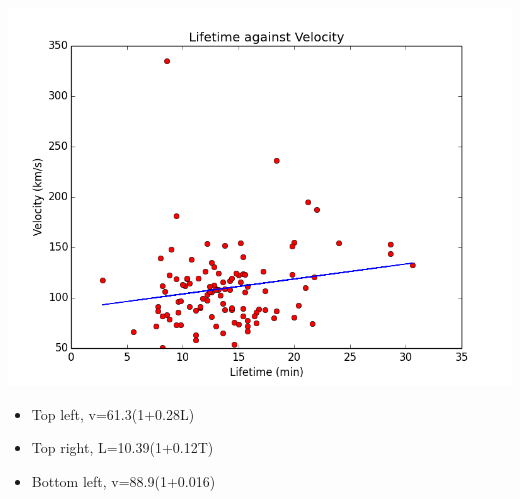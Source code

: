 \documentclass{beamer}
\begin{document}
\begin{frame}
\begin{minipage}{0.49\textwidth}
			\begin{flushright}
			\includegraphics[width=1\textwidth]{Figs/velocity_vs_lt.png}
			\end{flushright}
		\end{minipage}
		\begin{minipage}{0.49\textwidth}
			\begin{itemize}
				\small
				\item{Top left, v=61.3(1+0.28L)}
				\item{Top right, L=10.39(1+0.12T)}
				\item{Bottom left, v=88.9(1+0.016)}
			\end{itemize}
		\end{minipage}
	\end{frame}
\end{document}
